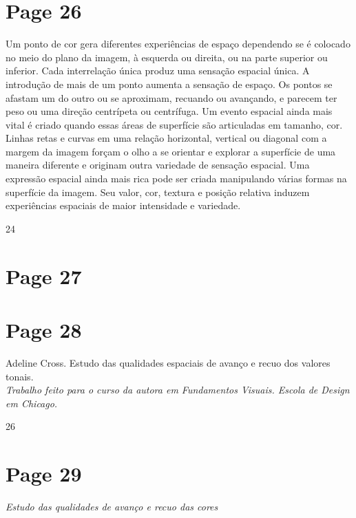 \documentclass[a4paper]{article}
\begin{document}
\section*{Page 26}

Um ponto de cor gera diferentes experiências de espaço dependendo se é colocado no meio do plano da imagem, à esquerda ou direita, ou na parte superior ou inferior. Cada interrelação única produz uma sensação espacial única. A introdução de mais de um ponto aumenta a sensação de espaço. Os pontos se afastam um do outro ou se aproximam, recuando ou avançando, e parecem ter peso ou uma direção centrípeta ou centrífuga. Um evento espacial ainda mais vital é criado quando essas áreas de superfície são articuladas em tamanho, cor. Linhas retas e curvas em uma relação horizontal, vertical ou diagonal com a margem da imagem forçam o olho a se orientar e explorar a superfície de uma maneira diferente e originam outra variedade de sensação espacial. Uma expressão espacial ainda mais rica pode ser criada manipulando várias formas na superfície da imagem. Seu valor, cor, textura e posição relativa induzem experiências espaciais de maior intensidade e variedade.

24

\newpage
\section*{Page 27}


\newpage
\section*{Page 28}

Adeline Cross. Estudo das qualidades espaciais de avanço e recuo dos valores tonais.\\
\textit{Trabalho feito para o curso da autora em Fundamentos Visuais. Escola de Design em Chicago.}

26

\newpage
\section*{Page 29}

\noindent\itshape Estudo das qualidades de avanço e recuo das cores

\null
\vspace*{\fill}
\end{document}
